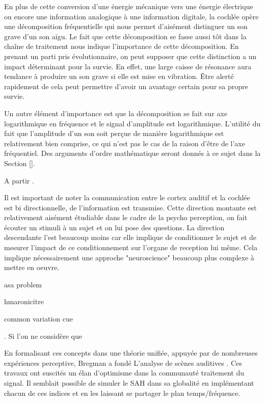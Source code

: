 En plus de cette conversion d'une énergie mécanique vers une énergie électrique ou encore une information analogique à une information digitale, la cochlée opère une décomposition fréquentielle qui nous permet d'aisément distinguer un son grave d'un son aigu. Le fait que cette décomposition se fasse aussi tôt dans la chaîne de traitement nous indique l'importance de cette décomposition. En prenant un parti pris évolutionnaire, on peut supposer que cette distinction a un impact déterminant pour la survie. En effet, une large caisse de résonance aura tendance à produire un son grave si elle est mise en vibration. Être alerté rapidement de cela peut permettre d'avoir un avantage certain pour sa propre survie.

Un autre élément d'importance est que la décomposition se fait sur axe logarithmique en fréquence et le signal d'amplitude est logarithmique. L'utilité du fait que l'amplitude d'un son soit perçue de manière logarithmique est relativement bien comprise, ce qui n'est pas le cas de la raison d'être de l'axe fréquentiel. Des arguments d'ordre mathématique seront donnés à ce sujet dans la Section \ref{}.


A partir .

Il est important de noter la communication entre le cortex auditif et la cochlée est bi directionnelle, de l'information est transmise. Cette direction montante est relativement aisément étudiable dans le cadre de la psycho perception, on fait écouter un stimuli à un sujet et on lui pose des questions. La direction descendante l'est beaucoup moins car elle implique de conditionner le sujet et de mesurer l'impact de ce conditionnement sur l'organe de reception lui même. Cela implique nécessairement une approche "neuroscience" beaucoup plus complexe à mettre en oeuvre. \cite{mesgarani2012selective}

asa problem

hmaronicitre

common variation cue



. Si l'on ne considère que

En formalisant ces concepts dans une théorie unifiée, appuyée par de nombreuses expériences perceptive, Bregman a fondé
L'analyse de scènes auditives \cite{bregman1994auditory}. Ces travaux ont suscités un élan d'optimisme dans la communauté traitement du signal. Il semblait possible de simuler le SAH dans sa globalité en implémentant chacun de ces indices et en les laissant se partager le plan temps/fréquence.

